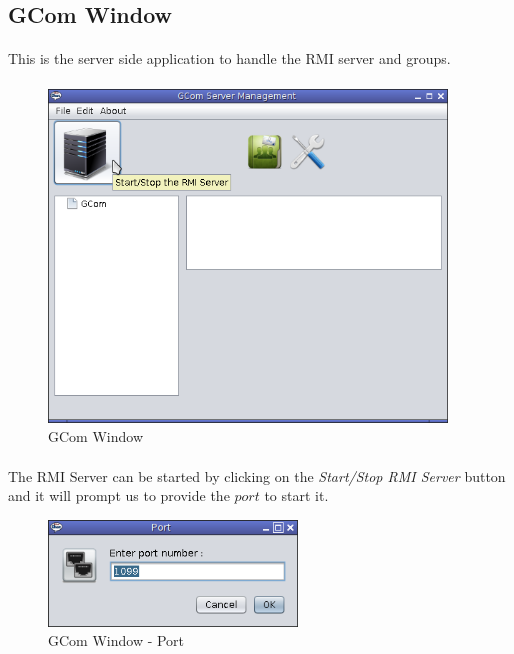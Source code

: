 \documentclass[a4paper,english,twoside]{article}
\begin{document}
\subsection{GCom Window}
\paragraph{}
This is the server side application to handle the RMI server and groups.

\paragraph{}
\begin{figure}[h]
\begin{center}
\includegraphics[width=400px]{GCom-1.png}
\caption{GCom Window}
\end{center}
\end{figure}

\paragraph{}
The RMI Server can be started by clicking on the \textit{Start/Stop RMI Server} button and it will prompt us to provide the $port$ to start it.

\begin{figure}[h]
\begin{center}
\includegraphics[width=250px]{GCom-Port.png}
\caption{GCom Window - Port}
\end{center}
\end{figure}
\end{document}
